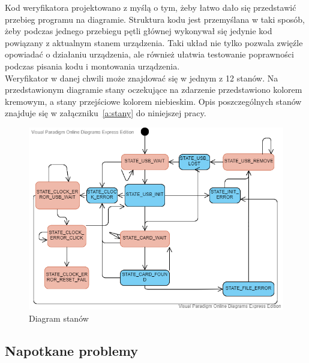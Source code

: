 \documentclass[declaration,shortabstract, mgr]{iithesis}
\begin{document}
\indent Kod weryfikatora projektowano z myślą o tym, żeby łatwo dało się przedstawić przebieg programu na diagramie. Struktura kodu jest przemyślana w taki sposób, żeby podczas jednego przebiegu pętli głównej wykonywał się jedynie kod powiązany z aktualnym stanem urządzenia. Taki układ nie tylko pozwala zwięźle opowiadać o działaniu urządzenia, ale również ułatwia testowanie poprawności podczas pisania kodu i montowania urządzenia.\\
\indent Weryfikator w danej chwili może znajdować się w jednym z 12 stanów. Na przedstawionym diagramie stany oczekujące na zdarzenie przedstawiono kolorem kremowym, a stany przejściowe kolorem niebieskim. Opis poszczególnych stanów znajduje się w załączniku~\ref{a:stany} do niniejszej pracy.
\begin{figure}[h]
\caption{Diagram stanów}
\centering
\includegraphics[scale=0.6]{state_machine.png}
\end{figure}

\subsection{Napotkane problemy}
\end{document}
